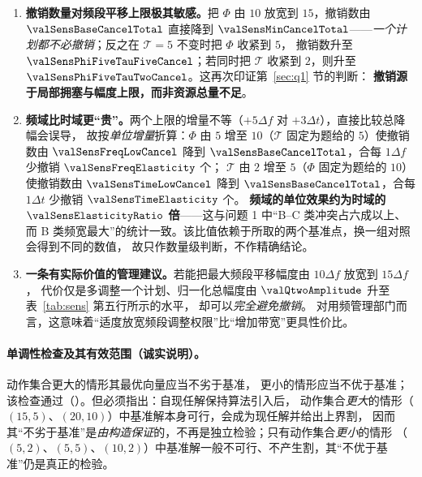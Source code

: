 \begin{enumerate}[leftmargin=1.8em,itemsep=0.2em]
  \item \textbf{撤销数量对频段平移上限极其敏感。}把 $\Phi$ 由 $10$ 放宽到 $15$，撤销数由 $\valSensBaseCancelTotal$
        直接降到 $\valSensMinCancelTotal$——\emph{一个计划都不必撤销}；反之在 $\mathcal{T}=5$ 不变时把 $\Phi$ 收紧到 $5$，
        撤销数升至 $\valSensPhiFiveTauFiveCancel$；若同时把 $\mathcal{T}$ 收紧到 $2$，则升至 $\valSensPhiFiveTauTwoCancel$。这再次印证第~\ref{sec:q1} 节的判断：
        \textbf{撤销源于局部拥塞与幅度上限，而非资源总量不足}。
  \item \textbf{频域比时域更“贵”。}两个上限的增量不等（$+5\Delta f$ 对 $+3\Delta t$），直接比较总降幅会误导，
        故按\emph{单位增量}折算：$\Phi$ 由 $5$ 增至 $10$（$\mathcal{T}$ 固定为题给的 $5$）使撤销数由
        $\valSensFreqLowCancel$ 降到 $\valSensBaseCancelTotal$，合每 $1\Delta f$ 少撤销 $\valSensFreqElasticity$ 个；
        $\mathcal{T}$ 由 $2$ 增至 $5$（$\Phi$ 固定为题给的 $10$）使撤销数由 $\valSensTimeLowCancel$ 降到
        $\valSensBaseCancelTotal$，合每 $1\Delta t$ 少撤销 $\valSensTimeElasticity$ 个。
        \textbf{频域的单位效果约为时域的 $\valSensElasticityRatio$ 倍}——这与问题 1 中“B--C 类冲突占六成以上、
        而 B 类频宽最大”的统计一致。该比值依赖于所取的两个基准点，换一组对照会得到不同的数值，
        故只作数量级判断，不作精确结论。
  \item \textbf{一条有实际价值的管理建议。}若能把最大频段平移幅度由 $10\Delta f$ 放宽到 $15\Delta f$，
        代价仅是多调整一个计划、归一化总幅度由 $\valQtwoAmplitude$ 升至表~\ref{tab:sens} 第五行所示的水平，
        却可以\emph{完全避免撤销}。
        对用频管理部门而言，这意味着“适度放宽频段调整权限”比“增加带宽”更具性价比。
\end{enumerate}


\paragraph{单调性检查及其有效范围（诚实说明）。}动作集合更大的情形其最优向量应当不劣于基准，
更小的情形应当不优于基准；该检查通过（\valSensMonotone{}）。但必须指出：自现任解保持算法引入后，
动作集合\emph{更大}的情形（$(15,5)$、$(20,10)$）中基准解本身可行，会成为现任解并给出上界割，
因而其“不劣于基准”是\emph{由构造保证}的，不再是独立检验；只有动作集合\emph{更小}的情形
（$(5,2)$、$(5,5)$、$(10,2)$）中基准解一般不可行、不产生割，其“不优于基准”仍是真正的检验。

